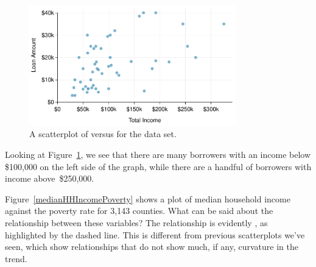 \begin{figure}[h]
   \centering
   \includegraphics[width=0.8\textwidth]{ch_summarizing_data/figures/loan50_amt_vs_income/loan50_amt_vs_income}
   \caption{A scatterplot of 
       versus  for the
        data set.}
   \label{loan50_amt_vs_income}
\end{figure}


Looking at Figure~\ref{loan50_amt_vs_income},
we see that there are many borrowers with an income below
\$100,000 on the left side of the graph,
while there are a handful of borrowers with income above~\$250,000.

\begin{example}{Figure~\ref{medianHHIncomePoverty}
    shows a plot of median household income
    against the poverty rate for 3,143 counties.
    What can be said about the relationship between
    these variables?}
  The relationship is evidently ,
  as highlighted by the dashed line.
  This is different from previous scatterplots we've seen,
  which show relationships that do not show much, if any,
  curvature in the trend.
\end{example}

